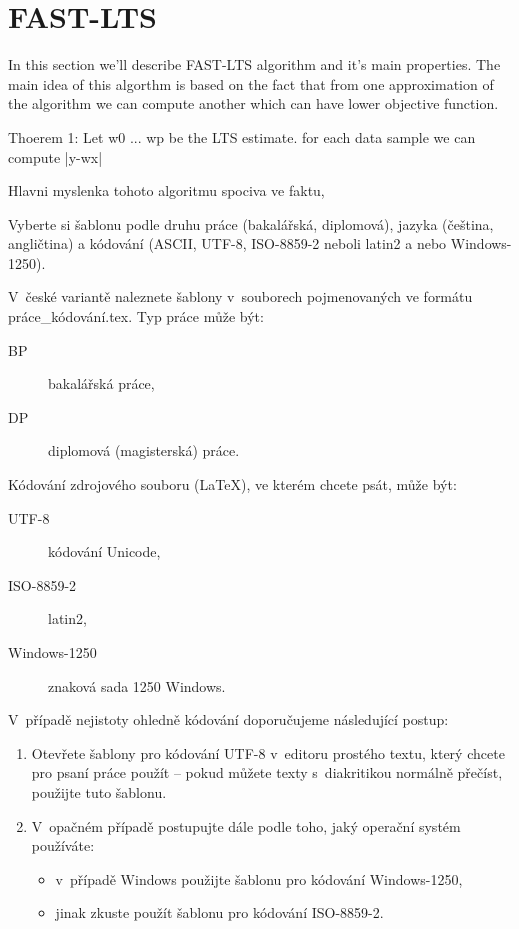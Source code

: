\documentclass[thesis=B,english]{FITthesis}[2012/10/20]
\begin{document}
\section{FAST-LTS}
In this section we'll describe FAST-LTS algorithm and it's main properties. The main idea of this algorthm is based on the fact that from one approximation of the algorithm we can compute another which can have lower objective function.

Thoerem 1:
Let w0 ... wp be the LTS estimate.
for each data sample we can compute |y-wx|



Hlavni myslenka tohoto algoritmu spociva ve faktu, 


Vyberte si šablonu podle druhu práce (bakalářská, diplomová), jazyka (čeština, angličtina) a kódování (ASCII, \mbox{UTF-8}, \mbox{ISO-8859-2} neboli latin2 a nebo \mbox{Windows-1250}). 

V~české variantě naleznete šablony v~souborech pojmenovaných ve formátu práce\_kódování.tex. Typ práce může být:
\begin{description}
	\item[BP] bakalářská práce,
	\item[DP] diplomová (magisterská) práce.
\end{description}
Kódování zdrojového souboru (\LaTeX{}), ve kterém chcete psát, může být:
\begin{description}
	\item[UTF-8] kódování Unicode,
	\item[ISO-8859-2] latin2,
	\item[Windows-1250] znaková sada 1250 Windows.
\end{description}
V~případě nejistoty ohledně kódování doporučujeme následující postup:
\begin{enumerate}
	\item Otevřete šablony pro kódování UTF-8 v~editoru prostého textu, který chcete pro psaní práce použít -- pokud můžete texty s~diakritikou normálně přečíst, použijte tuto šablonu.
	\item V~opačném případě postupujte dále podle toho, jaký operační systém používáte:
	\begin{itemize}
		\item v~případě Windows použijte šablonu pro kódování \mbox{Windows-1250},
		\item jinak zkuste použít šablonu pro kódování \mbox{ISO-8859-2}.
	\end{itemize}
\end{enumerate}
\end{document}
